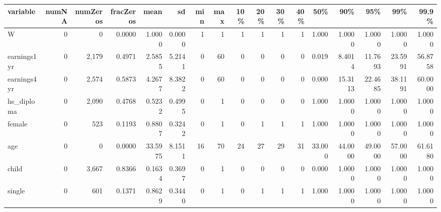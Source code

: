 
\begin{tabular}{lrrrrrrrrrrrrrrrr}
\toprule
variable & numNA & numZeros & fracZeros & mean & sd & min & max & 10\% & 20\% & 30\% & 40\% & 50\% & 90\% & 95\% & 99\% & 99.9\%\\
\midrule
W & 0 & 0 & 0.0000 & 1.0000 & 0.0000 & 1 & 1 & 1 & 1 & 1 & 1 & 1.000 & 1.0000 & 1.0000 & 1.0000 & 1.0000\\
earnings1yr & 0 & 2,179 & 0.4971 & 2.5855 & 5.2141 & 0 & 60 & 0 & 0 & 0 & 0 & 0.019 & 8.4014 & 11.7693 & 23.5991 & 56.8758\\
earnings4yr & 0 & 2,574 & 0.5873 & 4.2677 & 8.3822 & 0 & 60 & 0 & 0 & 0 & 0 & 0.000 & 15.3113 & 22.4685 & 38.1191 & 60.0000\\
hs\_diploma & 0 & 2,090 & 0.4768 & 0.5232 & 0.4995 & 0 & 1 & 0 & 0 & 0 & 0 & 1.000 & 1.0000 & 1.0000 & 1.0000 & 1.0000\\
female & 0 & 523 & 0.1193 & 0.8807 & 0.3242 & 0 & 1 & 0 & 1 & 1 & 1 & 1.000 & 1.0000 & 1.0000 & 1.0000 & 1.0000\\
\addlinespace
age & 0 & 0 & 0.0000 & 33.5975 & 8.1511 & 16 & 70 & 24 & 27 & 29 & 31 & 33.000 & 44.0000 & 49.0000 & 57.0000 & 61.6180\\
child & 0 & 3,667 & 0.8366 & 0.1634 & 0.3697 & 0 & 1 & 0 & 0 & 0 & 0 & 0.000 & 1.0000 & 1.0000 & 1.0000 & 1.0000\\
single & 0 & 601 & 0.1371 & 0.8629 & 0.3440 & 0 & 1 & 0 & 1 & 1 & 1 & 1.000 & 1.0000 & 1.0000 & 1.0000 & 1.0000\\
\bottomrule
\end{tabular}

